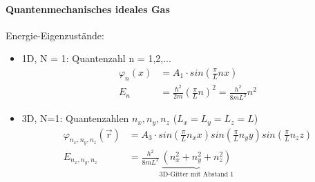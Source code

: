 \paragraph{Quantenmechanisches ideales Gas}
Energie-Eigenzustände:
\begin{itemize}
    \item 1D, N = 1: Quantenzahl n = 1,2,...
    \begin{align}
        \varphi_n(x) &= A_1 \cdot sin\left(\frac{\pi}{L} n x \right) \\
        E_n &= \frac{\hbar^2}{2m} \left(\frac{\pi}{L} n \right)^2 = \frac{h^2}{8mL^2} n^2
    \end{align}
    
    \begin{center}
\end{center}

    \item 3D, N=1: Quantenzahlen $n_x,n_y,n_z$ ($L_x=L_y=L_z=L$)
    \begin{align}
        \varphi_{n_x,n_y,n_z}(\Vec{r}) &= A_3 \cdot sin\left(\frac{\pi}{L} n_x x \right)  sin\left(\frac{\pi}{L} n_y y \right)  sin\left(\frac{\pi}{L} n_z z \right) \\
        E_{n_x,n_y,n_z} &= \frac{h^2}{8mL^2} \underbrace{(n_x^2 + n_y^2 +n_z^2)}_{\text{3D-Gitter mit Abstand 1}}
    \end{align}
    

\end{itemize}
